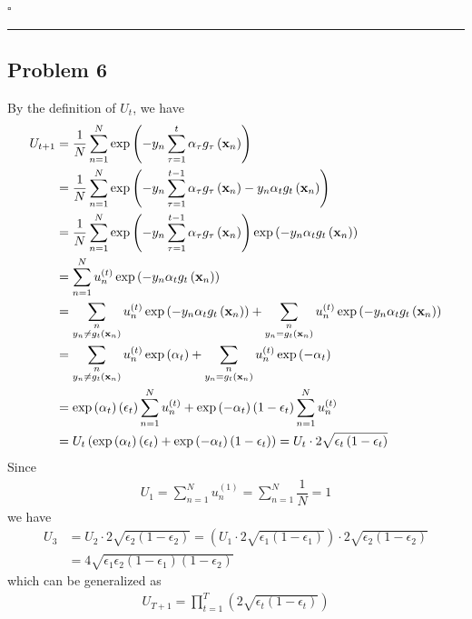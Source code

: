 \documentclass[12pt]{article}
\newcommand*{\QEDB}{\hfill\ensuremath{\square}}
\newcommand{\ParTh}[1]{\left(#1\right)}
\newcommand{\BF}[1]{{\bf#1}}
\newcommand{\horrule}[1]{\rule{\linewidth}{#1}}
\begin{document}
\QEDB

\horrule{0.5pt}

\subsection*{Problem 6}

By the definition of $U_{t}$, we have
\begin{align}
U_{t+1}&=\dfrac{1}{N}\sum_{n=1}^{N}\exp\ParTh{-y_n\sum_{\tau=1}^{t}\alpha_\tau g_\tau\ParTh{\BF{x}_n}}\\
&=\dfrac{1}{N}\sum_{n=1}^{N}\exp\ParTh{-y_n\sum_{\tau=1}^{t-1}\alpha_\tau g_\tau\ParTh{\BF{x}_n}-y_n\alpha_tg_t\ParTh{\BF{x}_n}}\\
&=\dfrac{1}{N}\sum_{n=1}^{N}\exp\ParTh{-y_n\sum_{\tau=1}^{t-1}\alpha_\tau g_\tau\ParTh{\BF{x}_n}}\exp\ParTh{-y_n\alpha_tg_t\ParTh{\BF{x}_n}}\\%
&=\sum_{n=1}^{N}u^{\ParTh{t}}_n\exp\ParTh{-y_n\alpha_tg_t\ParTh{\BF{x}_n}}\\
&=\sum_{\substack{n \\ y_n\neq g_t\ParTh{\BF{x}_n}}}u^{\ParTh{t}}_n\exp\ParTh{-y_n\alpha_tg_t\ParTh{\BF{x}_n}}+\sum_{\substack{n \\ y_n=g_t\ParTh{\BF{x}_n}}}u^{\ParTh{t}}_n\exp\ParTh{-y_n\alpha_tg_t\ParTh{\BF{x}_n}}\\
&=\sum_{\substack{n \\ y_n\neq g_t\ParTh{\BF{x}_n}}}u^{\ParTh{t}}_n\exp\ParTh{\alpha_t}+\sum_{\substack{n \\ y_n=g_t\ParTh{\BF{x}_n}}}u^{\ParTh{t}}_n\exp\ParTh{-\alpha_t}\\
&=\exp\ParTh{\alpha_t}\ParTh{\epsilon_t}\sum_{n=1}^{N}u^{\ParTh{t}}_n+\exp\ParTh{-\alpha_t}\ParTh{1-\epsilon_t}\sum_{n=1}^{N}u^{\ParTh{t}}_n\\
&=U_t\ParTh{\exp\ParTh{\alpha_t}\ParTh{\epsilon_t}+\exp\ParTh{-\alpha_t}\ParTh{1-\epsilon_t}}=U_t\cdot2\sqrt{\epsilon_t\ParTh{1-\epsilon_t}}
\end{align}
Since
\begin{align}
U_{1}=\sum_{n=1}^{N}u^{\ParTh{1}}_n=\sum_{n=1}^{N}\dfrac{1}{N}=1
\end{align}
we have
\begin{align}
U_3&=U_2\cdot2\sqrt{\epsilon_2\ParTh{1-\epsilon_2}}=\ParTh{U_1\cdot2\sqrt{\epsilon_1\ParTh{1-\epsilon_1}}}\cdot2\sqrt{\epsilon_2\ParTh{1-\epsilon_2}}\\
&=4\sqrt{\epsilon_1\epsilon_2\ParTh{1-\epsilon_1}\ParTh{1-\epsilon_2}}
\end{align}
which can be generalized as
\begin{align}
U_{T+1}=\prod_{t=1}^{T}\ParTh{2\sqrt{\epsilon_t\ParTh{1-\epsilon_t}}}
\end{align}
\end{document}
